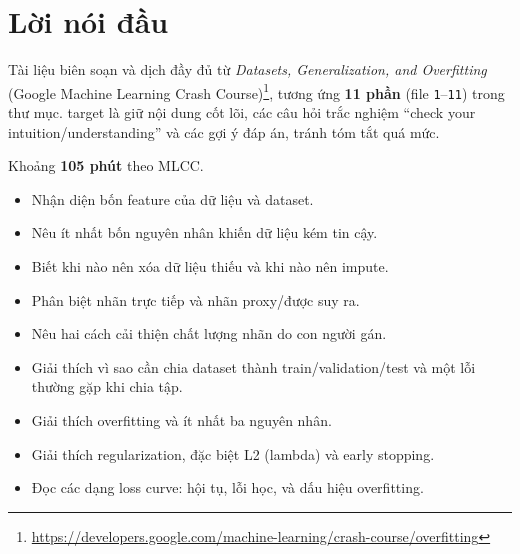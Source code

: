 \documentclass[12pt,a4paper]{article}
\begin{document}

\newpage\tableofcontents\newpage

\section*{Lời nói đầu}

\begin{ynghia}[title={Nguồn và cách đọc}]
Tài liệu biên soạn và dịch đầy đủ từ \emph{Datasets, Generalization, and Overfitting} (Google Machine Learning Crash Course)\footnote{\url{https://developers.google.com/machine-learning/crash-course/overfitting}}, tương ứng \textbf{11 phần} (file \texttt{1}--\texttt{11}) trong thư mục. target là giữ nội dung cốt lõi, các câu hỏi trắc nghiệm ``check your intuition/understanding'' và các gợi ý đáp án, tránh tóm tắt quá mức.
\end{ynghia}

\begin{luuy}[title={Thời lượng ước tính}]
Khoảng \textbf{105 phút} theo MLCC.
\end{luuy}

\begin{phuongphap}[title={target học tập}]
\begin{itemize}
  \item Nhận diện bốn feature của dữ liệu và dataset.
  \item Nêu ít nhất bốn nguyên nhân khiến dữ liệu kém tin cậy.
  \item Biết khi nào nên xóa dữ liệu thiếu và khi nào nên impute.
  \item Phân biệt nhãn trực tiếp và nhãn proxy/được suy ra.
  \item Nêu hai cách cải thiện chất lượng nhãn do con người gán.
  \item Giải thích vì sao cần chia dataset thành train/validation/test và một lỗi thường gặp khi chia tập.
  \item Giải thích overfitting và ít nhất ba nguyên nhân.
  \item Giải thích regularization, đặc biệt L2 (lambda) và early stopping.
  \item Đọc các dạng loss curve: hội tụ, lỗi học, và dấu hiệu overfitting.
\end{itemize}
\end{phuongphap}
\end{document}
